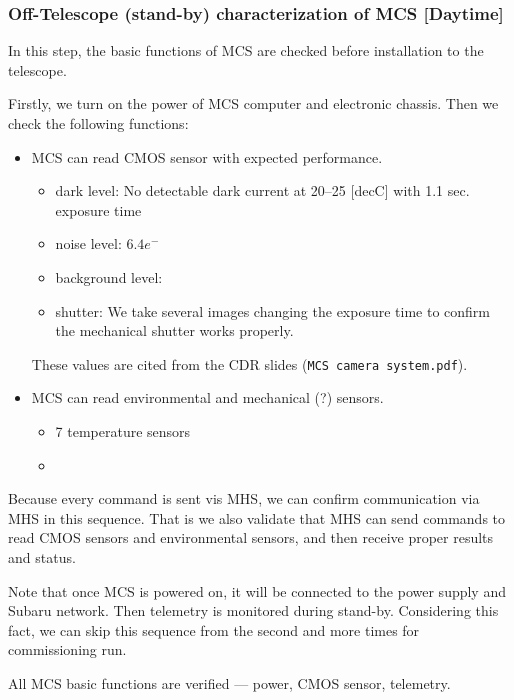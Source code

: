 \subsubsection{Off-Telescope (stand-by) characterization of MCS [Daytime]}\label{secflow:MCSoff}
In this step, the basic functions of MCS are checked before installation to the telescope.

Firstly, we turn on the power of MCS computer and electronic chassis.
Then we check the following functions:

\begin{itemize}
\item MCS can read CMOS sensor with expected performance.
	\begin{itemize}
	\item dark level: No detectable dark current at 20--25 [decC] with 1.1 sec. exposure time
	\item noise level: $6.4 e^-$
	\item background level: 
	\item shutter: We take several images changing the exposure time to confirm the mechanical shutter works properly.
	\end{itemize}
These values are cited from the CDR slides ({\tt MCS camera system.pdf}).
\item MCS can read environmental and mechanical (?) sensors.
	\begin{itemize}
	\item 7 temperature sensors 
	\item {}
	\end{itemize}
\end{itemize}

Because every command is sent vis MHS, we can confirm communication via MHS in this sequence. 
That is we also validate that MHS can send commands to read CMOS sensors and environmental sensors, and then receive proper results and status.


Note that once MCS is powered on, it will be connected to the power supply and Subaru network.
Then telemetry is monitored during stand-by.
Considering this fact, we can skip this sequence from the second and more times for commissioning run.

\begin{itembox}[l]{}
All MCS basic functions are verified --- power, CMOS sensor, telemetry. 

\end{itembox}